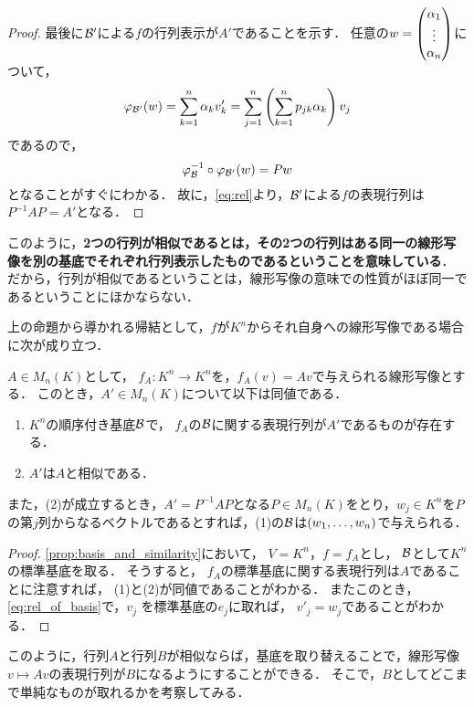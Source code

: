 \begin{proof}
    最後に$\mathcal{B}'$による$f$の行列表示が$A'$であることを示す．
    任意の$w=\begin{pmatrix} \alpha_{1} \\ \vdots \\ \alpha_{n} \end{pmatrix}$について，
    \[
        \varphi_{\mathcal{B}'}(w) 
        = \sum_{k=1}^n \alpha_k v'_k
        = \sum_{j=1}^n \left(\sum_{k=1}^n p_{jk} \alpha_k\right) v_j
    \]
    であるので，
    \[
        \varphi_{\mathcal{B}}^{-1} \circ \varphi_{\mathcal{B}'}(w) = P w
    \]
    となることがすぐにわかる．
    故に，\eqref{eq:rel}より，$\mathcal{B}'$による$f$の表現行列は$P^{-1}AP=A'$となる．
\end{proof}
このように，\textbf{2つの行列が相似であるとは，その2つの行列はある同一の線形写像を別の基底でそれぞれ行列表示したものであるということを意味している}．
だから，行列が相似であるということは，線形写像の意味での性質がほぼ同一であるということにほかならない．

上の命題から導かれる帰結として，$f$が$K^n$からそれ自身への線形写像である場合に次が成り立つ．
\begin{prop}\label{prop:change_basis_similarity}
    $A \in M_n(K)$として，
    $f_A \colon K^n \to K^n$を，$f_A(v)=Av$で与えられる線形写像とする．
    このとき，$A' \in M_n(K)$について以下は同値である．
    \begin{enumerate}
        \item $K^n$の順序付き基底$\mathcal{B}$で，
        $f_A$の$\mathcal{B}$に関する表現行列が$A'$であるものが存在する．
        \item $A'$は$A$と相似である．
    \end{enumerate}
    また，(2)が成立するとき，$A'=P^{-1}AP$となる$P \in M_n(K)$をとり，$w_j \in K^n$を$P$の第$j$列からなるベクトルであるとすれば，(1)の$\mathcal{B}$は$(w_{1},\dots,w_{n})$で与えられる．
\end{prop}
\begin{proof}
    \cref{prop:basis_and_similarity}において，
    $V = K^n$，$f=f_A$とし，
    $\mathcal{B}$として$K^n$の標準基底を取る．
    そうすると，
    $f_A$の標準基底に関する表現行列は$A$であることに注意すれば，
    (1)と(2)が同値であることがわかる．
    またこのとき，\eqref{eq:rel_of_basis}で，$v_j$ を標準基底の$e_j$に取れば，
    $v'_j = w_j$であることがわかる．
\end{proof}
このように，行列$A$と行列$B$が相似ならば，基底を取り替えることで，線形写像$v \mapsto Av$の表現行列が$B$になるようにすることができる．
そこで，$B$としてどこまで単純なものが取れるかを考察してみる．
